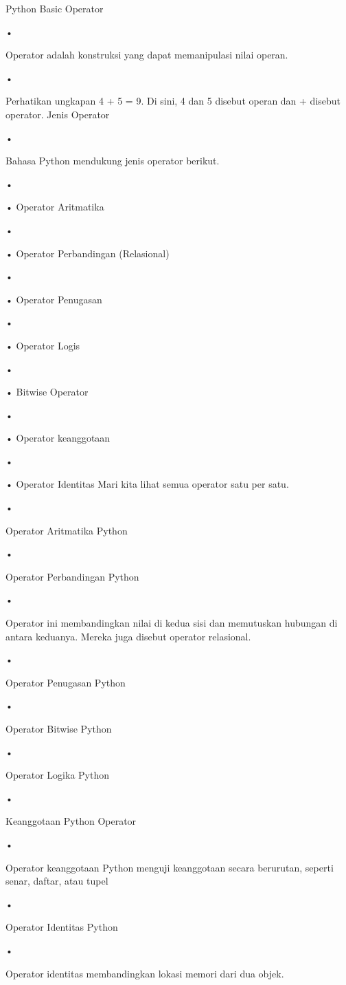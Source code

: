 Python Basic Operator
\begin{flushleft}
•
\end{flushleft}Operator adalah konstruksi yang dapat memanipulasi nilai operan.
\begin{flushleft}
•
\end{flushleft}Perhatikan ungkapan 4 + 5 = 9. Di sini, 4 dan 5 disebut operan dan + disebut operator.
Jenis Operator
\begin{flushleft}
•
\end{flushleft}Bahasa Python mendukung jenis operator berikut.
\begin{flushleft}
•
\end{flushleft}•	Operator Aritmatika
\begin{flushleft}
•
\end{flushleft}•	Operator Perbandingan (Relasional)
\begin{flushleft}
•
\end{flushleft}•	Operator Penugasan
\begin{flushleft}
•
\end{flushleft}•	Operator Logis
\begin{flushleft}
•
\end{flushleft}•	Bitwise Operator
\begin{flushleft}
•
\end{flushleft}•	Operator keanggotaan
\begin{flushleft}
•
\end{flushleft}•	Operator Identitas
Mari kita lihat semua operator satu per satu.
\begin{flushleft}
•
\end{flushleft}Operator Aritmatika Python
\begin{flushleft}
•
\end{flushleft}Operator Perbandingan Python
\begin{flushleft}
•
\end{flushleft}Operator ini membandingkan nilai di kedua sisi dan memutuskan hubungan di antara keduanya. Mereka juga disebut operator relasional.
\begin{flushleft}
•
\end{flushleft}Operator Penugasan Python
\begin{flushleft}
•
\end{flushleft}Operator Bitwise Python
\begin{flushleft}
•
\end{flushleft}Operator Logika Python
\begin{flushleft}
•
\end{flushleft}Keanggotaan Python Operator
\begin{flushleft}
•
\end{flushleft}Operator keanggotaan Python menguji keanggotaan secara berurutan, seperti senar, daftar, atau tupel
\begin{flushleft}
•
\end{flushleft}Operator Identitas Python
\begin{flushleft}
•
\end{flushleft}Operator identitas membandingkan lokasi memori dari dua objek.
